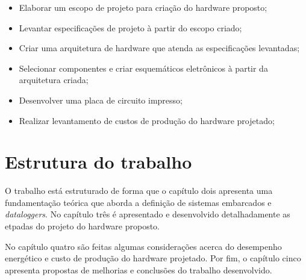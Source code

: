 \begin{itemize}
    \item Elaborar um escopo de projeto para criação do hardware proposto;
    \item Levantar especificações de projeto à partir do escopo criado;
    \item Criar uma arquitetura de hardware que atenda as especificações levantadas;
    \item Selecionar componentes e criar esquemáticos eletrônicos à partir da arquitetura criada;
    \item Desenvolver uma placa de circuito impresso;
    \item Realizar levantamento de custos de produção do hardware projetado;
    
\end{itemize}


\section{Estrutura do trabalho}

O trabalho está estruturado de forma que o capítulo dois apresenta uma fundamentação teórica que aborda a definição de sistemas embarcados e \textit{dataloggers}. No capítulo três é apresentado e desenvolvido detalhadamente as etpadas do projeto do hardware proposto.

No capítulo quatro são feitas algumas considerações acerca do desempenho energético e custo de produção do hardware projetado. Por fim, o capítulo cinco apresenta propostas de melhorias e conclusões do trabalho desenvolvido.













